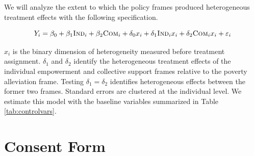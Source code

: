 \documentclass[11pt, a4paper]{article}\usepackage[]{graphicx}\usepackage[]{color}
\begin{document}
        We will analyze the extent to which the policy frames produced heterogeneous treatment effects with the following specification.

        \begin{equation}
            Y_{i} = \beta_{0} + \beta_{1}\text{\textsc{Ind}}_{i} + \beta_{2}\text{\textsc{Com}}_{i} + \delta_{0} x_i + \delta_{1}\text{\textsc{Ind}}_{i} x_i + \delta_{2}\text{\textsc{Com}}_{i} x_i + \varepsilon_{i}
        \label{eq:heteffect} \end{equation}

        $x_{i}$ is the binary dimension of heterogeneity measured before treatment assignment. $\delta_{1}$ and $\delta_{2}$ identify the heterogeneous treatment effects of the individual empowerment and collective support frames relative to the poverty alleviation frame. Testing $\delta_{1} = \delta_{2}$ identifies heterogeneous effects between the former two frames. Standard errors are clustered at the individual level. We estimate this model with the baseline variables summarized in Table \ref{tab:controlvars}.

\newpage

\printbibliography

\newpage

\appendix

\section{Consent Form}
\end{document}
